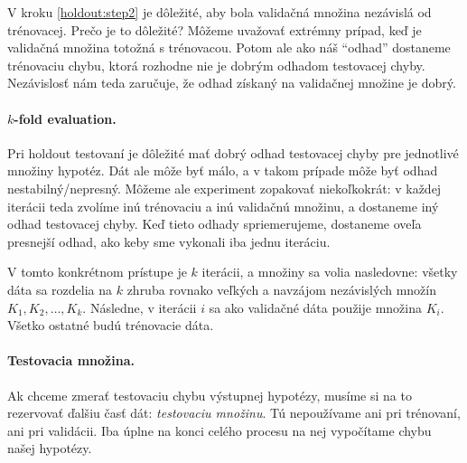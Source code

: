 V kroku \ref{holdout:step2} je dôležité, aby bola validačná
množina nezávislá od trénovacej. Prečo je to dôležité? Môžeme uvažovať
extrémny prípad, keď je validačná množina totožná s trénovacou. Potom
ale ako náš ``odhad'' dostaneme trénovaciu chybu, ktorá rozhodne nie
je dobrým odhadom testovacej chyby. Nezávislosť nám teda zaručuje, že
odhad získaný na validačnej množine je dobrý.

\paragraph{$k$-fold evaluation.} Pri holdout testovaní je dôležité mať
dobrý odhad testovacej chyby pre jednotlivé množiny hypotéz. Dát ale
môže byť málo, a v takom prípade môže byť odhad nestabilný/nepresný.
Môžeme ale experiment zopakovať niekoľkokrát: v každej iterácii teda
zvolíme inú trénovaciu a inú validačnú množinu, a dostaneme iný odhad
testovacej chyby. Keď tieto odhady spriemerujeme, dostaneme oveľa
presnejší odhad, ako keby sme vykonali iba jednu iteráciu.

V tomto konkrétnom prístupe je $k$ iterácii, a množiny sa volia
nasledovne: všetky dáta sa rozdelia na $k$ zhruba rovnako veľkých
a navzájom nezávislých množín $K_1, K_2, \ldots, K_k$. Následne,
v iterácii $i$ sa ako validačné dáta použije množina $K_i$. Všetko
ostatné budú trénovacie dáta.

\paragraph{Testovacia množina.} Ak chceme zmerať testovaciu chybu
výstupnej hypotézy, musíme si na to rezervovať ďalšiu časť dát:
\emph{testovaciu množinu}. Tú nepoužívame ani pri trénovaní, ani
pri validácii. Iba úplne na konci celého procesu na nej vypočítame
chybu našej hypotézy.

